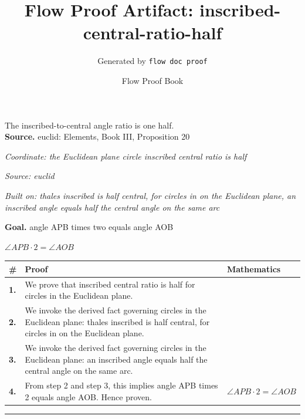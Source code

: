 \documentclass[11pt]{article}
\title{Flow Proof Artifact: inscribed-central-ratio-half}
\author{Generated by \texttt{flow doc proof}}
\date{Flow Proof Book}
\theoremstyle{definition}
\begin{document}
\maketitle
The inscribed-to-central angle ratio is one half.\\[0.5em]
\textbf{Source.} euclid: Elements, Book III, Proposition 20\\[0.5em]
\bigskip
{}\par
\smallskip\noindent\textit{Coordinate: the Euclidean plane \cdot circle \cdot inscribed central ratio is half}\par
\smallskip\noindent\textit{Source: euclid}\par
\smallskip\noindent\textit{Built on: thales inscribed is half central, for circles in on the Euclidean plane, an inscribed angle equals half the central angle on the same arc}\par
\medskip
\noindent\textbf{Goal.} angle APB times two equals angle AOB\par
\noindent$\displaystyle \angle APB \cdot 2 = \angle AOB$\par
\medskip
\noindent
\begin{tabular}{@{} >{\raggedright\arraybackslash}p{} >{\raggedright\arraybackslash}p{} >{\raggedleft\arraybackslash}p{} @{}}
\textbf{\#} & \textbf{Proof} & \textbf{Mathematics} \\
\midrule
\textbf{1.} & We prove that inscribed central ratio is half for circles in the Euclidean plane. & \\[0.45em]
\textbf{2.} & We invoke the derived fact governing circles in the Euclidean plane: thales inscribed is half central, for circles in on the Euclidean plane. & \\[0.45em]
\textbf{3.} & We invoke the derived fact governing circles in the Euclidean plane: an inscribed angle equals half the central angle on the same arc. & \\[0.45em]
\textbf{4.} & From step 2 and step 3, this implies angle APB times 2 equals angle AOB. Hence proven. & $\displaystyle \angle APB \cdot 2 = \angle AOB$ \\[0.45em]
\bottomrule
\end{tabular}
\label{thm:Geometry-circle-inscribed_central_ratio_is_half}
\par\medskip\hrule
\end{document}
